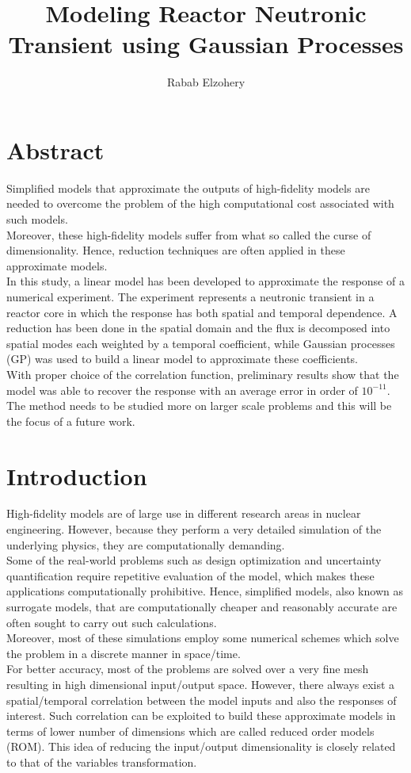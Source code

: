 \documentclass{anstrans}
\title{Modeling Reactor Neutronic Transient using Gaussian Processes}
\author{Rabab Elzohery}
\institute{
Department of Mechanical \& Nuclear Engineering, Kansas State University, Manhattan, KS 66506
}
\begin{document}

\section{Abstract}
Simplified models that approximate the outputs of high-fidelity models are needed to overcome the 
problem of the high computational cost associated with such models.\\
Moreover, these high-fidelity models suffer from what so called the curse of dimensionality. Hence, reduction techniques 
are often applied in these approximate models.\\
In this study, a linear model has been developed to approximate the response of a numerical experiment. The experiment represents a neutronic transient in a reactor core in which the response has both spatial and temporal dependence. 
A reduction has been done in the spatial domain and the flux is decomposed into spatial modes each weighted by a temporal coefficient, while Gaussian processes (GP) was used to build a linear model to approximate these coefficients.\\
With proper choice of the correlation function, preliminary results show that the model was able to recover the response  with an average error in order of $10^{-11}$.\\
The method needs to be studied more on larger scale problems and this will be the focus of a future work.

\section{Introduction}
High-fidelity models are of large use in different research areas in nuclear engineering. However, because they perform a very detailed simulation of the underlying physics, they are computationally demanding.\\
Some of the real-world problems such as design optimization and uncertainty quantification require repetitive evaluation of the model, which makes these applications computationally prohibitive.
Hence, simplified models, also known as surrogate models, that are computationally cheaper and reasonably accurate are often sought to carry out such calculations.\\
Moreover, most of these simulations employ some numerical schemes which solve the problem in a discrete manner in space/time.\\
For better accuracy, most of the problems are solved over a very fine mesh resulting in high dimensional input/output space.
However, there always exist a spatial/temporal correlation between the model inputs and also the responses of interest. 
Such correlation can be exploited to build these approximate models in terms of lower number of dimensions which are called reduced order models (ROM). 
This idea of reducing the input/output dimensionality is closely related to that of the variables transformation.
\end{document}
